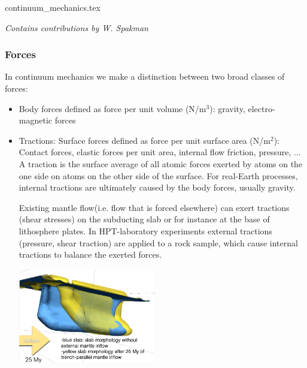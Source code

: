 \begin{flushright} {\tiny {\color{gray} continuum\_mechanics.tex}} \end{flushright}

{\sl Contains contributions by W. Spakman} 

\subsubsection{Forces}

In continuum mechanics we make a distinction between two broad classes of forces:
\begin{itemize}
\item Body forces defined as force per unit volume (N/m$^3$): gravity, electro-magnetic forces
\item Tractions: Surface forces defined as force per unit surface area (N/m$^2$):
Contact forces, elastic forces per unit area, internal flow friction, pressure, ...\\
A traction is the surface average of all atomic forces exerted by
atoms on the one side on atoms on the other side of the surface.
For real-Earth processes, internal tractions are ultimately caused by
the body forces, usually gravity.


Existing mantle flow(i.e. flow that is forced elsewhere) can exert
tractions (shear stresses) on the subducting slab or for instance at
the base of lithosphere plates.
In HPT-laboratory experiments external tractions (pressure, shear
traction) are applied to a rock sample, which cause internal
tractions to balance the exerted forces.

\begin{center}
\includegraphics[width=6cm]{images/contmech/spak1}
\end{center}
\end{itemize}

